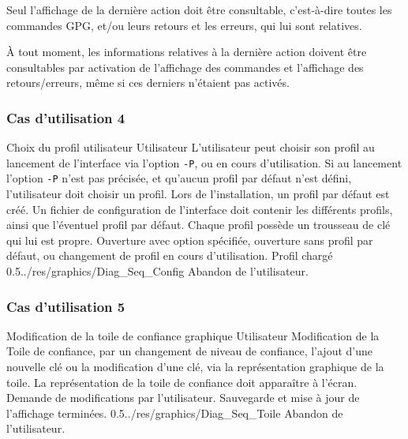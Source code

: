 \documentclass{../res/univ-projet}
\begin{document}
Seul l'affichage de la dernière action doit être consultable, c'est-à-dire toutes les commandes GPG, et/ou leurs retours et les erreurs, qui lui sont relatives.

\`{A} tout moment, les informations relatives à la dernière action doivent être consultables par activation de l'affichage des commandes et l'affichage des retours/erreurs, même si ces derniers n'étaient pas activés.


\subsubsection{Cas d'utilisation 4}
\ficheGraphic
{Choix du profil utilisateur}
{Utilisateur}
{L'utilisateur peut choisir son profil au lancement de l'interface via l'option \texttt{-P}, ou en cours d'utilisation. Si au lancement l'option \texttt{-P} n'est pas précisée, et qu'aucun profil par défaut n'est défini, l'utilisateur doit choisir un profil. Lors de l'installation, un profil par défaut est créé.}
{Un fichier de configuration de l'interface doit contenir les différents profils, ainsi que l'éventuel profil par défaut. 
Chaque profil possède un trousseau de clé qui lui est propre.}
{Ouverture avec option spécifiée, ouverture sans profil par défaut, ou changement de profil en cours d'utilisation.}
{Profil chargé}
{0.5}{../res/graphics/Diag_Seq_Config}
{Abandon de l'utilisateur.}
\vspace{0.5cm}


\subsubsection{Cas d'utilisation 5}
\ficheGraphic
{Modification de la toile de confiance graphique}         
{Utilisateur}
{Modification de la Toile de confiance, par un changement de niveau de confiance, l'ajout d'une nouvelle clé ou la modification d'une clé, via la représentation graphique de la toile.}
{La représentation de la toile de confiance doit apparaître à l'écran.}
{Demande de modifications par l'utilisateur.}
{Sauvegarde et mise à jour de l'affichage terminées.}
{0.5}{../res/graphics/Diag_Seq_Toile}
{Abandon de l'utilisateur.}                      
\vspace{0.5cm}
  
\end{document}

